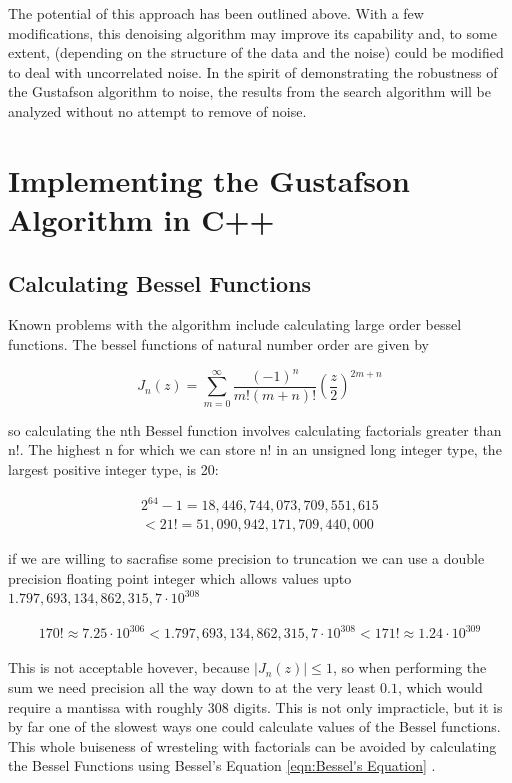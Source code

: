\documentclass[onecolumn, groupedaddress, 10pt]{revtex4-1}
\begin{document}
The potential of this approach has been outlined above. With a few modifications, this denoising algorithm may improve its capability and, to some extent, (depending on the structure of the data and the noise) could be modified to deal with uncorrelated noise. In the spirit of demonstrating the robustness of the Gustafson algorithm to noise, the results from the search algorithm will be analyzed without no attempt to remove of noise.

\section{Implementing the Gustafson Algorithm in C++}
\subsection{Calculating Bessel Functions}
Known problems with the algorithm include calculating large order bessel functions.  The bessel functions of natural number order are given by

\begin{equation}
J_n(z) = \sum_{m=0}^{\infty} \frac{(-1)^n}{m!(m+n)!} \left( \frac{z}{2} \right)^{2m+n}
\end{equation}

so calculating the nth Bessel function involves calculating factorials greater than n!.  The highest n for which we can store n! in an unsigned long integer type, the largest positive integer type, is 20:

\begin{align}
2^{64}-1 = 18,446,744,073,709,551,615 \\
< 21! = 51,090,942,171,709,440,000
\end{align}

if we are willing to sacrafise some precision to truncation we can use a double precision floating point integer which allows values upto $1.797,693,134,862,315,7 \cdot 10^{308}$

\begin{align}
170! \approx 7.25 \cdot 10^{306}
< 1.797,693,134,862,315,7 \cdot 10^{308} <
171! \approx 1.24 \cdot 10^{309}
\end{align}

This is not acceptable hovever, because $\left| J_n(z) \right| \leq 1$, so when performing the sum we need precision all the way down to at the very least $0.1$, which would require a mantissa with roughly $308$ digits.  This is not only impracticle, but it is by far one of the slowest ways one could calculate values of the Bessel functions.  This whole buiseness of wresteling with factorials can be avoided by calculating the Bessel Functions using Bessel's Equation \ref{eqn:Bessel's Equation} \citep{folland}.
\end{document}
